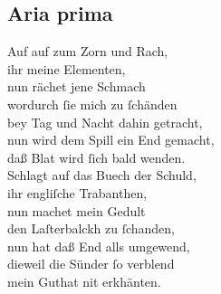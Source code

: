 \documentclass{ees}
\newenvironment{lyrics}[1]{%
  \subsection{#1}\nopagebreak%
  \begin{lyricslist}%
  \let\voice\item%
}{%
  \end{lyricslist}%
}
\begin{document}
\clearpage
\begin{lyrics}{Aria prima}
  \voice[Judex]
  Auf auf zum Zorn und Rach,\\
  ihr meine Elementen,\\
  nun rächet jene Schmach\\
  wordurch ſie mich zu ſchänden\\
  bey Tag und Nacht dahin getracht,\\
  nun wird dem Spill ein End gemacht,\\
  daß Blat wird ſich bald wenden.\\[1ex]
  Schlagt auf das Buech der Schuld,\\
  ihr engliſche Trabanthen,\\
  nun machet mein Gedult\\
  den Laſterbalckh zu ſchanden,\\
  nun hat daß End alls umgewend,\\
  dieweil die Sünder ſo verblend\\
  mein Guthat nit erkhänten.
\end{lyrics}
\end{document}
